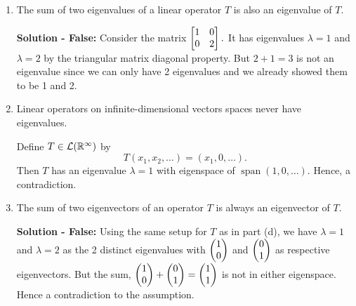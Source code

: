 \begin{enumerate}
    \item The sum of two eigenvalues of a linear operator $T$ is also an eigenvalue of $T$.
    \begin{mybox}
        \textbf{Solution - False: } Consider the matrix $\begin{bmatrix}{1} & {0}\\{0}&{2}\end{bmatrix}.$ It has eigenvalues $\lambda = 1$ and $\lambda = 2$ by the triangular matrix diagonal property. But $2 + 1 = 3$ is not an eigenvalue since we can only have 2 eigenvalues and we already showed them to be 1 and 2.
    \end{mybox}

    \item Linear operators on infinite-dimensional vectors spaces never have eigenvalues.
    \begin{mybox}
        Define $T \in \mathcal{L} (\mathbb{R}^{\infty})$ by
        $$T(x_1, x_2, \dots) = (x_1, 0, \dots).$$
        Then $T$ has an eigenvalue $\lambda = 1$ with eigenspace of $\operatorname{span}(1, 0, \dots)$. Hence, a contradiction.
    \end{mybox}

    \item The sum of two eigenvectors of an operator $T$ is always an eigenvector of $T$.
    \begin{mybox}
        \textbf{Solution - False: } Using the same setup for $T$ as in part (d), we have $\lambda = 1$ and $\lambda = 2$ as the 2 distinct eigenvalues with $\begin{pmatrix}{1}\\{0}\end{pmatrix}$ and $\begin{pmatrix}{0}\\{1}\end{pmatrix}$ as respective eigenvectors. But the sum, $\begin{pmatrix}{1}\\{0}\end{pmatrix} + \begin{pmatrix}{0}\\{1}\end{pmatrix} = \begin{pmatrix}{1}\\{1}\end{pmatrix}$ is not in either eigenspace. Hence a contradiction to the assumption.
    \end{mybox}

\end{enumerate}